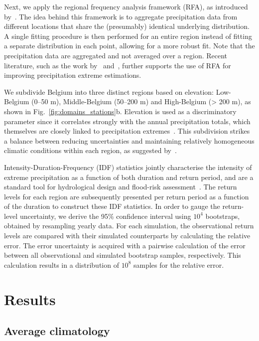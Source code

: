 \documentclass[journal abbreviation, manuscript]{copernicus}
\begin{document}
Next, we apply the regional frequency analysis framework (RFA), as introduced by~\citet{hosking_statistics_1993}. 
The idea behind this framework is to aggregate precipitation data from different locations that share the (presumably) identical underlying distribution. 
A single fitting procedure is then performed for an entire region instead of fitting a separate distribution in each point, allowing for a more robust fit. 
Note that the precipitation data are aggregated and not averaged over a region.
Recent literature, such as the work by~\citet{carreau_partitioning_2017} and~\citet{guerreiro_unravelling_2024}, further supports the use of RFA for improving precipitation extreme estimations. 

We subdivide Belgium into three distinct regions based on elevation: Low-Belgium (0--50 m), Middle-Belgium (50--200 m) and High-Belgium (> 200 m), as shown in Fig.~\ref{fig:domains_stations}b.
Elevation is used as a discriminatory parameter since it correlates strongly with the annual precipitation totals, which themselves are closely linked to precipitation extremes~\citep{van_de_vyver_spatial_2012}. 
This subdivision strikes a balance between reducing uncertainties and maintaining relatively homogeneous climatic conditions within each region, as suggested by~\citet{van_de_vyver_spatial_2012}.

Intensity-Duration-Frequency (IDF) statistics jointly characterise the intensity of extreme precipitation as a function of both duration and return period, and are a standard tool for hydrological design and flood-risk assessment~\citep{tabari_local_2016}. 
The return levels for each region are subsequently presented per return period as a function of the duration to construct these IDF statistics.
In order to gauge the return-level uncertainty, we derive the 95\% confidence interval using $10^4$ bootstraps, obtained by resampling yearly data. 
For each simulation, the observational return levels are compared with their simulated counterparts by calculating the relative error. 
The error uncertainty is acquired with a pairwise calculation of the error between all observational and simulated bootstrap samples, respectively. 
This calculation results in a distribution of $10^8$ samples for the relative error.

\section{Results}
\label{sect:results}

\subsection{Average climatology}
\end{document}
